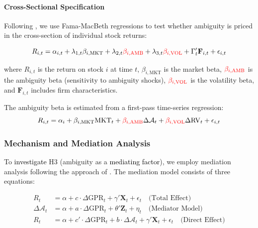 \documentclass[preprint,12pt,authoryear]{elsarticle}
\begin{document}
\paragraph{Cross-Sectional Specification}
Following \citet{Fama1992Cross}, we use Fama-MacBeth regressions to test whether ambiguity is priced in the cross-section of individual stock returns:

\begin{equation}
R_{i,t} = \alpha_{i,t} + \lambda_{1,t} \beta_{i,\text{MKT}} + \lambda_{2,t} {\color{red}\beta_{i,\text{AMB}}} + \lambda_{3,t} {\color{red}\beta_{i,\text{VOL}}} + \Gamma_{t}' \mathbf{F}_{i,t} + \epsilon_{i,t}
\end{equation}

where $R_{i,t}$ is the return on stock $i$ at time $t$, $\beta_{i,\text{MKT}}$ is the market beta, ${\color{red}\beta_{i,\text{AMB}}}$ is the ambiguity beta (sensitivity to ambiguity shocks), ${\color{red}\beta_{i,\text{VOL}}}$ is the volatility beta, and $\mathbf{F}_{i,t}$ includes firm characteristics.

The ambiguity beta is estimated from a first-pass time-series regression:
\begin{equation}
R_{i,t} = \alpha_i + \beta_{i,\text{MKT}} \text{MKT}_t + {\color{red}\beta_{i,\text{AMB}}} \Delta \mathcal{A}_t + {\color{red}\beta_{i,\text{VOL}}} \Delta \text{RV}_t + \epsilon_{i,t}
\end{equation}

\subsubsection{Mechanism and Mediation Analysis}

To \textcolor{black}{investigate} H3 (ambiguity as a \textcolor{black}{mediating factor}), we employ mediation analysis following the approach of \citet{Baron1986Moderator}. The mediation model consists of three equations:

\begin{align}
R_{t} &= \alpha + c \cdot \Delta \text{GPR}_{t} + \gamma' \mathbf{X}_{t} + \epsilon_{t} \quad \text{(Total Effect)} \\
\Delta \mathcal{A}_{t} &= \alpha + a \cdot \Delta \text{GPR}_{t} + \theta' \mathbf{Z}_{t} + \eta_{t} \quad \text{(Mediator Model)} \\
R_{t} &= \alpha + c' \cdot \Delta \text{GPR}_{t} + b \cdot \Delta \mathcal{A}_{t} + \gamma' \mathbf{X}_{t} + \epsilon_{t} \quad \text{(Direct Effect)}
\end{align}
\end{document}
